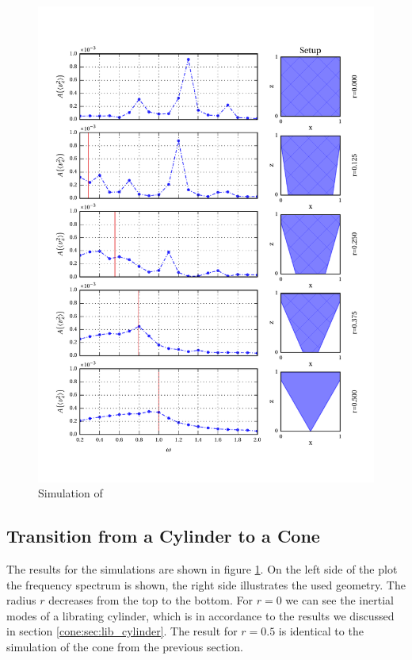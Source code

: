 \clearpage

\begin{figure}[!pt]
  \centering
  \includegraphics{gfx/cone/transition/transition.pdf}
  \caption{\label{fig:cone:transition}
    Simulation of
  }
\end{figure}

\clearpage
\subsection{Transition from a Cylinder to a Cone }
The results for the simulations are shown in figure \ref{fig:cone:transition}.
On the left side of the plot  the frequency spectrum is shown, the right side illustrates the used geometry.
The radius $r$ decreases from the top to the bottom.
For $r=0$ we can see the inertial modes of a librating cylinder, which is in accordance
to the results we discussed in section \ref{cone:sec:lib_cylinder}.
The result for $r=0.5$ is identical to the simulation of the cone from the previous section.

